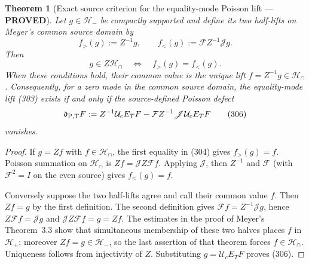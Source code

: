 \documentclass[11pt]{article}
\newtheorem{theorem}{Theorem}
\newcommand{\PROVED}{\textcolor{green!45!black}{\textbf{PROVED}}}
\begin{document}
\begin{theorem}[Exact source criterion for the equality-mode Poisson lift ---
\PROVED]
Let $g\in\mathcal H_-$ be compactly supported and define its two half-lifts
on Meyer's common source domain by
\begin{equation}
 f_>(g):=Z^{-1}g,
 \qquad
 f_<(g):=\mathcal FZ^{-1}\mathscr Jg.                 \tag{304}
\end{equation}
Then
\begin{equation}
 \boxed{\quad
 g\in Z\mathcal H_\cap
 \quad\Longleftrightarrow\quad
 f_>(g)=f_<(g).\quad}                                \tag{305}
\end{equation}
When these conditions hold, their common value is the unique lift
$f=Z^{-1}g\in\mathcal H_\cap$.  Consequently, for a zero mode in the
common source domain, the equality-mode lift (303) exists if and only if
the source-defined Poisson defect
\begin{equation}
 \mathfrak d_{\rm P,T}F
 :=Z^{-1}\mathcal U_cE_TF
  -\mathcal FZ^{-1}\mathscr J\mathcal U_cE_TF         \tag{306}
\end{equation}
vanishes.
\end{theorem}

\begin{proof}
If $g=Zf$ with $f\in\mathcal H_\cap$, the first equality in (304) gives
$f_>(g)=f$.  Poisson summation on $\mathcal H_\cap$ is
$Zf=\mathscr JZ\mathcal Ff$.  Applying $\mathscr J$, then $Z^{-1}$ and
$\mathcal F$ (with $\mathcal F^2=I$ on the even source) gives
$f_<(g)=f$.

Conversely suppose the two half-lifts agree and call their common value
$f$.  Then $Zf=g$ by the first definition.  The second definition gives
$\mathcal Ff=Z^{-1}\mathscr Jg$, hence
$Z\mathcal Ff=\mathscr Jg$ and
$\mathscr JZ\mathcal Ff=g=Zf$.  The estimates in the proof of Meyer's
Theorem~3.3 show that simultaneous membership of these two halves places
$f$ in $\mathcal H_+$; moreover $Zf=g\in\mathcal H_-$, so the last assertion
of that theorem forces $f\in\mathcal H_\cap$.  Uniqueness follows from
injectivity of $Z$.  Substituting $g=\mathcal U_cE_TF$ proves (306).
\end{proof}
\end{document}
